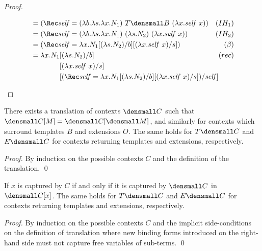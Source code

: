 \begin{proof}
\begin{enumerate}[(a)]
\begin{itemize}
\begin{align*}
        &=
        (\Rec \mathit{self}
        = (\lambda b. \lambda s. \lambda x. N_1)
        ~ T\den{B}
        ~ (\lambda x. \mathit{self} ~ x))
        &(IH_1)
        \\
        &=
        (\Rec \mathit{self}
        = (\lambda b. \lambda s. \lambda x. N_1)
        ~ (\lambda s. N_2)
        ~ (\lambda x. \mathit{self} ~ x))
        &(IH_2)
        \\
        &=
        (\Rec \mathit{self}
        = \lambda x.N_1\subst{b}{(\lambda s.N_2)}\subst{s}{(\lambda x.\mathit{self}~x)})
        &(\beta)
        \\
        &=
        \begin{aligned}[t]
          \lambda x.
          N_1
          &\subst{b}{(\lambda s.N_2)}
          \\
          &\subst{s}{(\lambda x.\mathit{self}~x)}
          \\
          &\rlap
          {$
            \subst
            {\mathit{self}}
            {
              (\Rec \mathit{self}
              =
              \lambda x.N_1\subst{b}{(\lambda s.N_2)}\subst{s}{(\lambda x.\mathit{self}~x)})
            }
          $}
        \end{aligned}
        &(rec)
      \end{align*}
    \end{itemize}
  \end{enumerate}
\end{proof}

\begin{lemma}[Compositionality]
  \label{thm:compositional-translation}

  There exists a translation of contexts $\den{C}$ such that $\den{C[M]} = \den{C}{[\den{M}]}$, and similarly for contexts which surround templates $B$ and extensions $O$.
  The same holds for $T\den{C}$ and $E\den{C}$ for contexts returning templates and extensions, respectively.
\end{lemma}
\begin{proof}
  By induction on the possible contexts $C$ and the definition of the translation.
  \qed
\end{proof}

\begin{lemma}[Hygiene]
  \label{thm:hygienic-translation}

  If $x$ is captured by $C$ if and only if it is captured by $\den{C}$ in $\den{C}{[x]}$.
  The same holds for $T\den{C}$ and $E\den{C}$ for contexts returning templates and extensions, respectively.
\end{lemma}
\begin{proof}
  By induction on the possible contexts $C$ and the implicit side-conditions on the definition of translation where new binding forms introduced on the right-hand side must not capture free variables of sub-terms.
  \qed
\end{proof}

